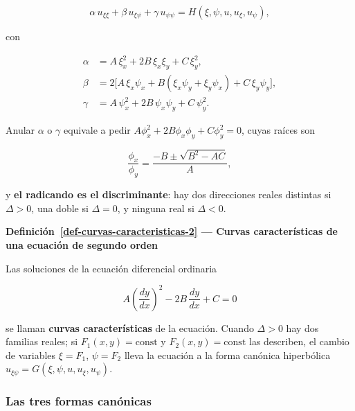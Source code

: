\documentclass[
  spanish,
  a4paper,
]{scrbook}
\theoremstyle{definition}
\theoremstyle{plain}
\theoremstyle{definition}
\theoremstyle{plain}
\theoremstyle{definition}
\theoremstyle{remark}
\begin{document}
\[
\alpha\,u_{\xi\xi} + \beta\,u_{\xi\psi} + \gamma\,u_{\psi\psi} = H(\xi,\psi,u,u_\xi,u_\psi),
\]

con

\[
\begin{aligned}
\alpha &= A\,\xi_x^2 + 2B\,\xi_x\xi_y + C\,\xi_y^2, \\
\beta  &= 2\big[A\,\xi_x\psi_x + B(\xi_x\psi_y + \xi_y\psi_x) + C\,\xi_y\psi_y\big], \\
\gamma &= A\,\psi_x^2 + 2B\,\psi_x\psi_y + C\,\psi_y^2 .
\end{aligned}
\]

Anular \(\alpha\) o \(\gamma\) equivale a pedir
\(A\phi_x^2 + 2B\phi_x\phi_y + C\phi_y^2 = 0\), cuyas raíces son

\[
\frac{\phi_x}{\phi_y} = \frac{-B \pm \sqrt{B^2-AC}}{A} ,
\]

y \textbf{el radicando es el discriminante}: hay dos direcciones reales
distintas si \(\Delta>0\), una doble si \(\Delta=0\), y ninguna real si
\(\Delta<0\).

\begin{tcolorbox}[enhanced jigsaw, arc=.35mm, bottomrule=.15mm, breakable, colback=white, colframe=quarto-callout-note-color-frame, left=2mm, leftrule=.75mm, opacityback=0, rightrule=.15mm, toprule=.15mm]
\begin{minipage}[t]{5.5mm}
\textcolor{quarto-callout-note-color}{\faInfo}
\end{minipage}%
\begin{minipage}[t]{\textwidth - 5.5mm}

\vspace{-3mm}\textbf{Definición~\ref{def-curvas-caracteristicas-2} --- Curvas características
de una ecuación de segundo orden}\vspace{3mm}

Las soluciones de la ecuación diferencial ordinaria

\[
A\left(\frac{dy}{dx}\right)^2 - 2B\,\frac{dy}{dx} + C = 0
\]

se llaman \textbf{curvas características} de la ecuación. Cuando
\(\Delta>0\) hay dos familias reales; si \(F_1(x,y) = \text{const}\) y
\(F_2(x,y) = \text{const}\) las describen, el cambio de variables
\(\xi = F_1\), \(\psi = F_2\) lleva la ecuación a la forma canónica
hiperbólica \(u_{\xi\psi} = G(\xi,\psi,u,u_\xi,u_\psi)\).

\end{minipage}%
\end{tcolorbox}

\subsubsection{Las tres formas
canónicas}\label{las-tres-formas-canuxf3nicas}
\end{document}
